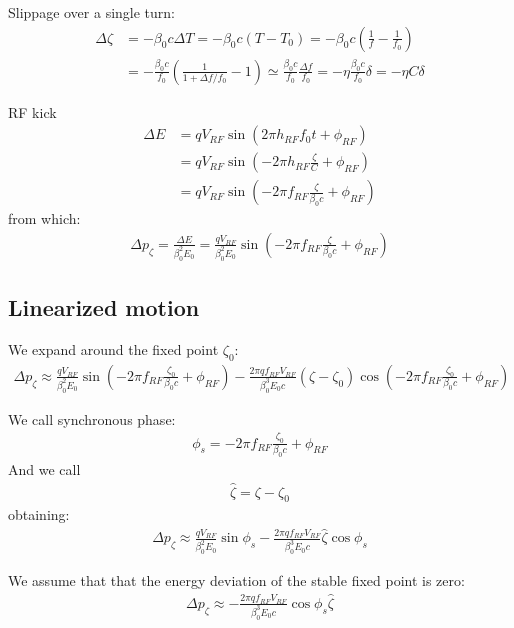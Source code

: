 Slippage over a single turn:
\begin{align}
\Delta \zeta 
& = -\beta_0 c \Delta T 
= -\beta_0 c (T - T_0) 
= -\beta_0 c \left(\frac{1}{f} - \frac{1}{f_0}\right) \\
&= -\frac{\beta_0 c}{f_0} \left(\frac{1}{1 + {\Delta f}/{f_0}} - 1\right)
\simeq \frac{\beta_0 c}{f_0}\frac{\Delta f}{f_0}
= -\eta \frac{\beta_0 c}{f_0}\delta
= -\eta C \delta
\end{align}

RF kick
\begin{align}
\Delta E
& = q V_{RF} \sin\left( 2 \pi h_{RF} f_0 t + \phi_{RF} \right)\\
& = q V_{RF} \sin\left(-2 \pi h_{RF} \frac{\zeta}{C} + \phi_{RF} \right)\\
& = q V_{RF} \sin\left(-2 \pi f_{RF} \frac{\zeta}{\beta_0 c} + \phi_{RF} \right)
\end{align}
from which:
\begin{align}
\Delta p_\zeta = \frac{\Delta E}{\beta_0^2E_0} 
= \frac{q V_{RF}}{\beta_0^2E_0}\sin\left(-2 \pi f_{RF} \frac{\zeta}{\beta_0 c} + \phi_{RF}\right)
\end{align}

\subsection{Linearized motion}

We expand around the fixed point $\zeta_0$:
\begin{align}
\Delta p_\zeta \approx \frac{q V_{RF}}{\beta_0^2E_0}\sin\left(-2 \pi f_{RF} \frac{\zeta_0}{\beta_0 c} + \phi_{RF}\right) -\frac{2\pi q f_{RF}V_{RF}}{\beta_0^3 E_0 c}(\zeta-\zeta_0)\cos\left(-2\pi f_{RF} \frac{\zeta_0}{\beta_0 c} + \phi_{RF}\right)
\end{align}

We call synchronous phase:
\begin{align}
\phi_s = -2 \pi f_{RF} \frac{\zeta_0}{\beta_0 c} + \phi_{RF}
\end{align}
And we call 
\begin{align}
\hat{\zeta}= \zeta - \zeta_0
\end{align}
obtaining:
\begin{align}
\Delta p_\zeta \approx \frac{q V_{RF}}{\beta_0^2E_0}\sin{\phi_s} -\frac{2\pi q f_{RF} V_{RF}}{\beta_0^3 E_0 c}\hat{\zeta}\cos{\phi_s}
\end{align}

We assume that that the energy deviation of the stable fixed point is zero:
\begin{align}
\Delta {p}_\zeta \approx -\frac{2\pi q f_{RF} V_{RF}}{\beta_0^3 E_0 c}\cos{\phi_s}\hat{\zeta}
\label{eq:deltapzeta}
\end{align}


